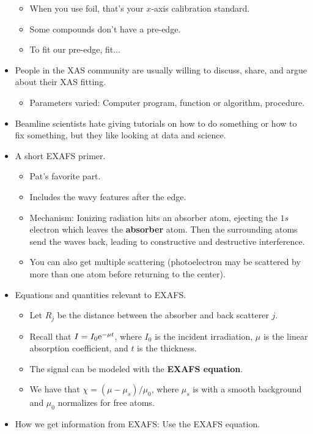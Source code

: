 \documentclass[../notes.tex]{subfiles}
\begin{document}
\begin{itemize}
\begin{itemize}
        \item When you use foil, that's your $x$-axis calibration standard.
        \item Some compounds don't have a pre-edge.
        \item To fit our pre-edge, fit...
    \end{itemize}
    \item People in the XAS community are usually willing to discuss, share, and argue about their XAS fitting.
    \begin{itemize}
        \item Parameters varied: Computer program, function or algorithm, procedure.
    \end{itemize}
    \item Beamline scientists hate giving tutorials on how to do something or how to fix something, but they like looking at data and science.
    \item A short EXAFS primer.
    \begin{itemize}
        \item Pat's favorite part.
        \item Includes the wavy features after the edge.
        \item Mechanism: Ionizing radiation hits an absorber atom, ejecting the $1s$ electron which leaves the \textbf{absorber} atom. Then the surrounding atoms send the waves back, leading to constructive and destructive interference.
        \item You can also get multiple scattering (photoelectron may be scattered by more than one atom before returning to the center).
    \end{itemize}
    \item Equations and quantities relevant to EXAFS.
    \begin{itemize}
        \item Let $R_j$ be the distance between the absorber and back scatterer $j$.
        \item Recall that $I=I_0\e[-\mu t]$, where $I_0$ is the incident irradiation, $\mu$ is the linear absorption coefficient, and $t$ is the thickness.
        \item The signal can be modeled with the \textbf{EXAFS equation}.
        \item We have that $\chi=(\mu-\mu_s)/\mu_0$, where $\mu_s$ is with a smooth background and $\mu_0$ normalizes for free atoms.
    \end{itemize}
    \item How we get information from EXAFS: Use the EXAFS equation.

\end{itemize}
\end{document}
